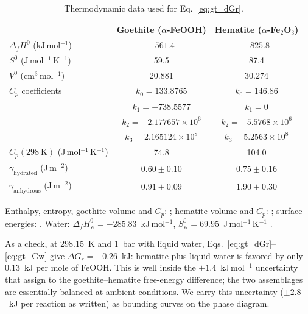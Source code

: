 \begin{table}[htbp]
  \centering
  \caption{Thermodynamic data used for Eq.~\eqref{eq:gt_dGr}.}
  \label{tab:gt_thermo_data}
  \begin{footnotesize}
  \begin{tabular}{lcc}
    \hline
    & Goethite ($\alpha$-FeOOH) & Hematite ($\alpha$-Fe$_2$O$_3$) \\
    \hline
    $\Delta_f H^0$ (kJ\,mol$^{-1}$) & $-561.4$ & $-825.8$ \\
    $S^0$ (J\,mol$^{-1}$\,K$^{-1}$) & 59.5 & 87.4 \\
    $V^0$ (cm$^3$\,mol$^{-1}$) & 20.881 & 30.274 \\
    $C_p$ coefficients & $k_0=133.8765$ & $k_0=146.86$ \\
          & $k_1=-738.5577$ & $k_1=0$ \\
          & $k_2=-2.177657\times10^{6}$ & $k_2=-5.5768\times10^{6}$ \\
          & $k_3=2.165124\times10^{8}$ & $k_3=5.2563\times10^{8}$ \\
    $C_p(298\ \mathrm{K})$ (J\,mol$^{-1}$\,K$^{-1}$) & 74.8 & 104.0 \\
    $\gamma_{\mathrm{hydrated}}$ (J\,m$^{-2}$) & $0.60\pm0.10$ & $0.75\pm0.16$ \\
    $\gamma_{\mathrm{anhydrous}}$ (J\,m$^{-2}$) & $0.91\pm0.09$ & $1.90\pm0.30$ \\
    \hline
  \end{tabular}
  \end{footnotesize}

  \vspace{0.5ex}
  \begin{minipage}{0.85\linewidth}\footnotesize
  Enthalpy, entropy, goethite volume and $C_p$: \citet{majzlan2003}; 
  hematite volume and $C_p$: \citet{berman1988}; surface energies: \citet{navrotsky2008}.
  Water: $\Delta_f H^0_{\mathrm{w}} = -285.83$~kJ\,mol$^{-1}$, $S^0_{\mathrm{w}} = 69.95$~J\,mol$^{-1}$\,K$^{-1}$ \citep{cox1989}.
  \end{minipage}
\end{table}

As a check, at 298.15~K and 1~bar with liquid water, Eqs.~\eqref{eq:gt_dGr}--\eqref{eq:gt_Gw}
give $\Delta G_r = -0.26$~kJ: hematite plus liquid water is favored by only 0.13~kJ per mole of
FeOOH. This is well inside the $\pm1.4$~kJ\,mol$^{-1}$ uncertainty that \citet{majzlan2003}
assign to the goethite--hematite free-energy difference; the two assemblages are essentially
balanced at ambient conditions. We carry this uncertainty ($\pm2.8$~kJ per reaction as written)
as bounding curves on the phase diagram.

